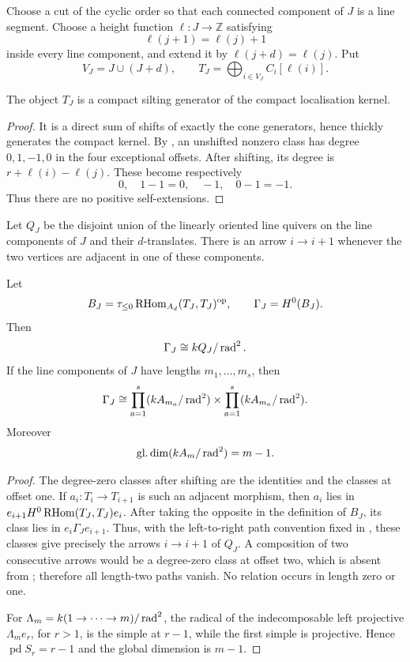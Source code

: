 Choose a cut of the cyclic order so that each connected component of \(J\) is a line segment.  Choose a height function
\(\ell:J\to\mathbb Z\) satisfying
\[
 \ell(j+1)=\ell(j)+1
\]
inside every line component, and extend it by
\(\ell(j+d)=\ell(j)\).  Put
\[
 V_J=J\cup(J+d),
 \qquad
 T_J=\bigoplus_{i\in V_J}C_i[\ell(i)].
\]

\begin{lemma}\label{lem:nakayama-silting}
The object \(T_J\) is a compact silting generator of the compact localisation kernel.
\end{lemma}

\begin{proof}
It is a direct sum of shifts of exactly the cone generators, hence thickly generates the compact kernel.  By , an unshifted nonzero class has degree \(0,1,-1,0\) in the four exceptional offsets.  After shifting, its degree is
\(r+\ell(i)-\ell(j)\).  These become respectively
\[
 0,\quad 1-1=0,\quad -1,\quad 0-1=-1.
\]
Thus there are no positive self-extensions.
\end{proof}

Let \(Q_J\) be the disjoint union of the linearly oriented line quivers on the line components of \(J\) and their \(d\)-translates.  There is an arrow \(i\to i+1\) whenever the two vertices are adjacent in one of these components.

\begin{proposition}\label{prop:nakayama-heart}
Let
\[
 B_J=\tau_{\le0}\operatorname{RHom}_{A_d}(T_J,T_J)^{\mathrm{op}},
 \qquad
 \Gamma_J=H^0(B_J).
\]
Then
\[
 \Gamma_J\cong kQ_J/\operatorname{rad}^2.
\]
If the line components of \(J\) have lengths
\(m_1,\ldots,m_s\), then
\[
 \Gamma_J\cong
 \prod_{a=1}^s(kA_{m_a}/\operatorname{rad}^2)
 \times
 \prod_{a=1}^s(kA_{m_a}/\operatorname{rad}^2).
\]
Moreover
\[
 \operatorname{gl.dim}(kA_m/\operatorname{rad}^2)=m-1.
\]
\end{proposition}

\begin{proof}
The degree-zero classes after shifting are the identities and the classes at offset one.  If \(a_i:T_i\to T_{i+1}\) is such an adjacent morphism, then \(a_i\) lies in
\(e_{i+1}H^0\operatorname{RHom}(T_J,T_J)e_i\).  After taking the opposite in the definition of \(B_J\), its class lies in
\(e_i\Gamma_Je_{i+1}\).  Thus, with the left-to-right path convention fixed in , these classes give precisely the arrows \(i\to i+1\) of \(Q_J\).  A composition of two consecutive arrows would be a degree-zero class at offset two, which is absent from ; therefore all length-two paths vanish.  No relation occurs in length zero or one.

For \(\Lambda_m=k(1\to\cdots\to m)/\operatorname{rad}^2\), the radical of the indecomposable left projective \(\Lambda_me_r\), for \(r>1\), is the simple at \(r-1\), while the first simple is projective.  Hence
\(\operatorname{pd}S_r=r-1\) and the global dimension is \(m-1\).
\end{proof}

